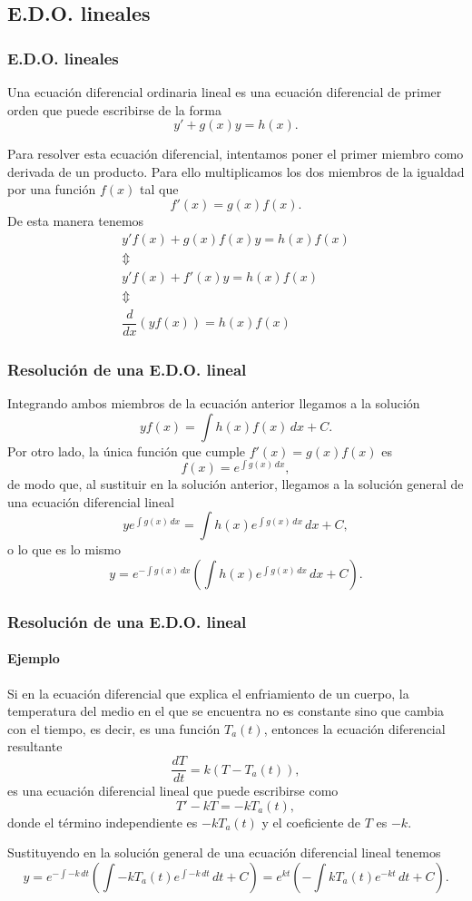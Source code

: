 \subsection{E.D.O. lineales}
\begin{frame}
	\frametitle{E.D.O. lineales}
	\begin{definicion}[E.D.O. lineal]
		Una ecuación diferencial ordinaria lineal es una ecuación diferencial de primer orden que puede escribirse de la forma
		\[y'+g(x)y = h(x).\]
	\end{definicion}
		
	Para resolver esta ecuación diferencial, intentamos poner el primer miembro como derivada de un producto. Para ello multiplicamos los dos miembros de la igualdad por una función $f(x)$ tal que 
	\[f'(x)=g(x)f(x).\]
	De esta manera tenemos
	\[
		\begin{array}{c}
			y'f(x)+g(x)f(x)y=h(x)f(x)     \\
			\Updownarrow                  \\
			y'f(x)+f'(x)y=h(x)f(x)        \\
			\Updownarrow                  \\
			\dfrac{d}{dx}(yf(x))=h(x)f(x) 
		\end{array}
	\]
\end{frame}


\begin{frame}
	\frametitle{Resolución de una E.D.O. lineal}
	Integrando ambos miembros de la ecuación anterior llegamos a la solución
	\[
		yf(x)=\int h(x)f(x)\,dx+C.
	\]
	Por otro lado, la única función que cumple $f'(x)=g(x)f(x)$ es
	\[
		f(x)=e^{\int g(x)\,dx},
	\]
	de modo que, al sustituir en la solución anterior, llegamos a la solución general de una ecuación diferencial lineal
	\[
		ye^{\int g(x)\,dx}=\int h(x) e^{\int g(x)\,dx}\,dx+C,
	\]
	o lo que es lo mismo
	\[
		y=e^{-\int g(x)\,dx}\left(\int h(x)e^{\int g(x)\,dx}\,dx+C\right).
	\]
\end{frame}


\begin{frame}
	\frametitle{Resolución de una E.D.O. lineal}
	\framesubtitle{Ejemplo}
	Si en la ecuación diferencial que explica el enfriamiento de un cuerpo, la temperatura del medio en el que se encuentra no es constante sino que cambia con el tiempo, es decir, es una función $T_a(t)$, entonces la ecuación diferencial resultante 
	\[
		\frac{dT}{dt}=k(T-T_a(t)),
	\]
	es una ecuación diferencial lineal que puede escribirse como
	\[
		T'-kT=-kT_a(t),
	\]
	donde el término independiente es $-kT_a(t)$ y el coeficiente de $T$ es $-k$.
		
	Sustituyendo en la solución general de una ecuación diferencial lineal tenemos
	\[
		y=e^{-\int -k\,dt}\left(\int -kT_a(t)e^{\int -k\,dt}\,dt+C\right)=
		e^{kt}\left(-\int kT_a(t)e^{-kt}\,dt+C\right).
	\]
\end{frame}



